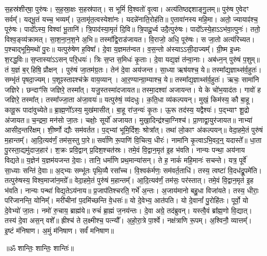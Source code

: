 

स॒हस्र॑शीर्‌षा॒ पुरु॑षः। 
स॒ह॒स्रा॒क्षः स॒हस्र॑पात्। 
स भूमिं॑ वि॒श्वतो॑ वृ॒त्वा। 
अत्य॑तिष्ठद्दशाङ्गु॒लम्॥ 
% 
पुरु॑ष ए॒वेदꣳ सर्वम्᳚। 
यद्भू॒तं यच्च॒ भव्यम्᳚। 
उ॒तामृ॑त॒त्वस्येशा॑नः। 
यदन्ने॑नाति॒रोह॑ति॥ 
% 
ए॒तावा॑नस्य महि॒मा। 
अतो॒ ज्यायाꣴ॑श्च॒ पूरु॑षः। 
पादो᳚ऽस्य॒ विश्वा॑ भू॒तानि॑। 
त्रि॒पाद॑स्या॒मृतं॑ दि॒वि॥ 
% 
त्रि॒पादू॒र्ध्व उदै॒त्पुरु॑षः। 
पादो᳚ऽस्ये॒हाऽऽभ॑वा॒त्पुनः॑। 
ततो॒ विश्व॒ङ्व्य॑क्रामत्। 
सा॒श॒ना॒न॒श॒ने अ॒भि॥ 
% 
तस्मा᳚द्वि॒राड॑जायत। 
वि॒राजो॒ अधि॒ पूरु॑षः। 
स जा॒तो अत्य॑रिच्यत। 
प॒श्चाद्भूमि॒मथो॑ पु॒रः॥ 
% 
 यत्पुरु॑षेण ह॒विषा᳚। 
दे॒वा य॒ज्ञमत॑न्वत। 
व॒स॒न्तो अ॑स्याऽऽसी॒दाज्यम्᳚। 
ग्री॒ष्म इ॒ध्मः श॒रद्ध॒विः॥ 
% 
 स॒प्तास्या॑ऽऽसन्  परि॒धयः॑। 
त्रिः स॒प्त स॒मिधः॑ कृ॒ताः। 
दे॒वा यद्य॒ज्ञं त॑न्वा॒नाः। 
अब॑ध्न॒न् पुरु॑षं प॒शुम्॥ 
% 
 तं य॒ज्ञं ब॒र्हिषि॒ प्रौक्षन्। 
पुरु॑षं जा॒तम॑ग्र॒तः। 
तेन॑ दे॒वा अय॑जन्त। 
सा॒ध्या ऋष॑यश्च॒ ये॥ 
% 
तस्मा᳚द्य॒ज्ञाथ्स॑र्व॒हुतः॑। 
सम्भृ॑तं पृषदा॒ज्यम्। 
प॒शूꣴस्ताꣴश्च॑क्रे वाय॒व्यान्। 
आ॒र॒ण्यान्ग्रा॒म्याश्च॒ ये॥ 
% 
 तस्मा᳚द्य॒ज्ञाथ्स॑र्व॒हुतः॑। 
ऋचः॒ सामा॑नि जज्ञिरे। 
छन्दाꣳ॑सि जज्ञिरे॒ तस्मा᳚त्। 
यजु॒स्तस्मा॑दजायत॥ 
% 
तस्मा॒दश्वा॑ अजायन्त। 
ये के चो॑भ॒याद॑तः। 
गावो॑ ह जज्ञिरे॒ तस्मा᳚त्। 
तस्मा᳚ज्जा॒ता अ॑जा॒वयः॑॥ 
% 
यत्पुरु॑षं॒ व्य॑दधुः। 
क॒ति॒धा व्य॑कल्पयन्। 
मुखं॒ किम॑स्य॒ कौ बा॒हू। 
कावू॒रू पादा॑वुच्येते॥ 
% 
ब्रा॒ह्म॒णो᳚ऽस्य॒ मुख॑मासीत्। 
बा॒हू रा॑ज॒न्यः॑ कृ॒तः। 
ऊ॒रू तद॑स्य॒ यद्वैश्यः॑। 
प॒द्भ्याꣳ शू॒द्रो अ॑जायत॥ 
% 
च॒न्द्रमा॒ मन॑सो जा॒तः। 
चक्षोः॒ सूर्यो॑ अजायत। 
मुखा॒दिन्द्र॑श्चा॒ग्निश्च॑। 
प्रा॒णाद्वा॒युर॑जायत॥ 
% 
नाभ्या॑ आसीद॒न्तरि॑क्षम्। 
शी॒र्ष्णो द्यौः सम॑वर्तत। 
प॒द्भ्यां भूमि॒र्दिशः॒ श्रोत्रा᳚त्। 
तथा॑ लो॒काꣳ अ॑कल्पयन्॥ 
% 
वेदा॒हमे॒तं पुरु॑षं म॒हान्तम्᳚। 
आ॒दि॒त्यव॑र्णं॒ तम॑स॒स्तु पा॒रे॥ 
% 
सर्वा॑णि रू॒पाणि॑ वि॒चित्य॒ धीरः॑। 
नामा॑नि कृ॒त्वाऽभि॒वद॒न्॒ यदास्ते᳚॥ 
% 
धा॒ता पु॒रस्ता॒द्यमु॑दाज॒हार॑। 
श॒क्रः प्रवि॒द्वान्  प्र॒दिश॒श्चत॑स्रः। 
तमे॒वं वि॒द्वान॒मृत॑ इ॒ह भ॑वति। 
नान्यः पन्था॒ अय॑नाय विद्यते॥ 
% 
य॒ज्ञेन॑ य॒ज्ञम॑यजन्त दे॒वाः। 
तानि॒ धर्मा॑णि प्रथ॒मान्या॑सन्। 
ते ह॒ नाकं॑ महि॒मानः॑ सचन्ते। 
यत्र॒ पूर्वे॑ सा॒ध्याः सन्ति॑ दे॒वाः॥ 
% 
अ॒द्भ्यः सम्भू॑तः पृथि॒व्यै रसा᳚च्च। 
वि॒श्वक॑र्मणः॒ सम॑वर्त॒ताधि॑। 
तस्य॒ त्वष्टा॑ वि॒दध॑द्रू॒पमे॑ति। 
तत्पुरु॑षस्य॒ विश्व॒माजा॑न॒मग्रे᳚॥ 
% 
वेदा॒हमे॒तं पुरु॑षं म॒हान्तम्᳚। 
आ॒दि॒त्यव॑र्णं॒ तम॑सः॒ पर॑स्तात्। 
तमे॒वं वि॒द्वान॒मृत॑ इ॒ह भ॑वति। 
नान्यः पन्था॑ विद्य॒तेऽय॑नाय॥ 
% 
प्र॒जाप॑तिश्चरति॒ गर्भे॑ अ॒न्तः। 
अ॒जाय॑मानो बहु॒धा विजा॑यते। 
तस्य॒ धीराः॒ परि॑जानन्ति॒ योनिम्᳚। 
मरी॑चीनां प॒दमि॑च्छन्ति वे॒धसः॑॥ 
% 
यो दे॒वेभ्य॒ आत॑पति। 
यो दे॒वानां᳚ पु॒रोहि॑तः। 
पूर्वो॒ यो दे॒वेभ्यो॑ जा॒तः। 
नमो॑ रु॒चाय॒ ब्राह्म॑ये॥ 
% 
रुचं॑ ब्रा॒ह्मं ज॒नय॑न्तः। 
दे॒वा अग्रे॒ तद॑ब्रुवन्। 
यस्त्वै॒वं ब्रा᳚ह्म॒णो वि॒द्यात्। 
तस्य॑ दे॒वा अस॒न् वशे᳚॥ 
% 
ह्रीश्च॑ ते ल॒क्ष्मीश्च॒ पत्न्यौ᳚। 
अ॒हो॒रा॒त्रे पा॒र्श्वे। 
नक्ष॑त्राणि रू॒पम्। 
अ॒श्विनौ॒ व्यात्तम्᳚। 
इ॒ष्टं म॑निषाण। 
अ॒मुं म॑निषाण। 
सर्वं॑ मनिषाण॥ 
% 
\centerline{॥ॐ शान्तिः॒ शान्तिः॒ शान्तिः॑॥}


